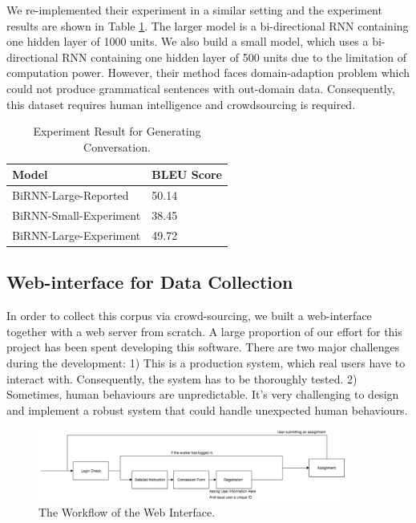 \documentclass[bsc,frontabs,twoside,singlespacing,parskip,deptreport]{infthesis}     %
\begin{document}
We re-implemented their experiment in a similar setting and the experiment results are shown in Table \ref{tab:genresult}. The larger model is a bi-directional RNN containing one hidden layer of 1000 units. We also build a small model, which uses a bi-directional RNN containing one hidden layer of 500 units due to the limitation of computation power. However, their method faces domain-adaption problem which could not produce grammatical sentences with out-domain data. Consequently, this dataset requires human intelligence and crowdsourcing is required. 

\begin{table}[]
\centering
\begin{tabular}{|l|l|}
\hline
Model                  & BLEU Score \\ \hline
BiRNN-Large-Reported   & 50.14      \\ \hline
BiRNN-Small-Experiment & 38.45      \\ \hline
BiRNN-Large-Experiment & 49.72      \\ \hline
\end{tabular}
\caption{Experiment Result for Generating Conversation\cite{indurthi2017generating}.}
\label{tab:genresult}
\end{table}

\newpage
\subsection{Web-interface for Data Collection}

In order to collect this corpus via crowd-sourcing, we built a web-interface together with a web server from scratch. A large proportion of our effort for this project has been spent developing this software. There are two major challenges during the development: 1) This is a production system, which real users have to interact with. Consequently, the system has to be thoroughly tested. 2) Sometimes, human behaviours are unpredictable. It's very challenging to design and implement a robust system that could handle unexpected human behaviours.


\begin{figure}[h]
    \centering
    \includegraphics[width=0.9\textwidth]{process.png}
    \caption{The Workflow of the Web Interface.}
    \label{fig:web}
\end{figure}
\end{document}
